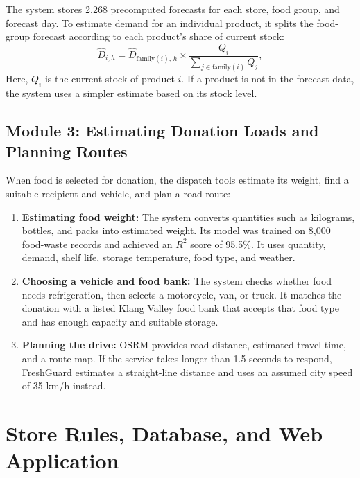 \documentclass[12pt,a4paper]{article}
\renewcommand{\_}{\oldunderscore\allowbreak}
\begin{document}
The system stores 2,268 precomputed forecasts for each store, food group, and forecast day. To estimate demand for an individual product, it splits the food-group forecast according to each product's share of current stock:
\begin{equation}
    \hat{D}_{i, h} = \hat{D}_{\text{family}(i),\, h} \times \frac{Q_i}{\sum_{j \in \text{family}(i)} Q_j},
\end{equation}
Here, $Q_i$ is the current stock of product $i$. If a product is not in the forecast data, the system uses a simpler estimate based on its stock level.

\subsection{Module 3: Estimating Donation Loads and Planning Routes}
When food is selected for donation, the dispatch tools estimate its weight, find a suitable recipient and vehicle, and plan a road route:
\begin{enumerate}[leftmargin=18pt, itemsep=2pt]
    \item \textbf{Estimating food weight:} The system converts quantities such as kilograms, bottles, and packs into estimated weight. Its model was trained on 8,000 food-waste records and achieved an $R^2$ score of 95.5\%. It uses quantity, demand, shelf life, storage temperature, food type, and weather.
    \item \textbf{Choosing a vehicle and food bank:} The system checks whether food needs refrigeration, then selects a motorcycle, van, or truck. It matches the donation with a listed Klang Valley food bank that accepts that food type and has enough capacity and suitable storage.
    \item \textbf{Planning the drive:} OSRM provides road distance, estimated travel time, and a route map. If the service takes longer than 1.5 seconds to respond, FreshGuard estimates a straight-line distance and uses an assumed city speed of 35 km/h instead.
\end{enumerate}

\section{Store Rules, Database, and Web Application}
\end{document}

